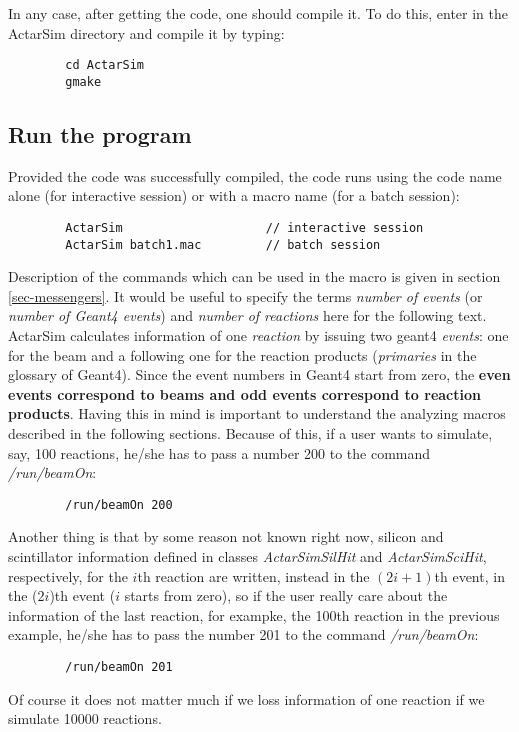 In any case, after getting the code, one should compile it. To do this, enter in the ActarSim directory 
and compile it by typing:
\begin{verbatim}
        cd ActarSim
        gmake
\end{verbatim}

\subsection{Run the program}

Provided the code was successfully compiled, the code runs using the code name alone (for interactive session) or with a macro name (for a batch session):
\begin{verbatim}
        ActarSim                    // interactive session
        ActarSim batch1.mac         // batch session
\end{verbatim}

Description of the commands which can be used in the macro is given in section \ref{sec-messengers}. It would be useful to specify the terms \textit{number of events} (or \textit{number of Geant4 events}) and \textit{number of reactions} here for the following text. ActarSim calculates information of one \textit{reaction} by issuing two geant4 \textit{events}: one for the beam and a following one for the reaction products (\textit{primaries} in the glossary of Geant4). Since the event numbers in Geant4 start from zero, the \textbf{even events correspond to beams and odd events correspond to reaction products}. Having this in mind is important to understand the analyzing macros described in the following sections. Because of this, if a user wants to simulate, say, 100 reactions, he/she has to pass a number 200 to the command \textit{/run/beamOn}:
\begin{verbatim}
        /run/beamOn 200
\end{verbatim}
Another thing is that by some reason not known right now, silicon and scintillator information defined in classes \textit{ActarSimSilHit} and \textit{ActarSimSciHit}, respectively, for the $i$th reaction are written, instead in the $(2i+1)$th event, in the ($2i$)th event ($i$ starts from zero), so if the user really care about the information of the last reaction, for exampke, the 100th reaction in the previous example, he/she has to pass the number 201 to the command \textit{/run/beamOn}:
\begin{verbatim}
        /run/beamOn 201
\end{verbatim}
Of course it does not matter much if we loss information of one reaction if we simulate 10000 reactions.
